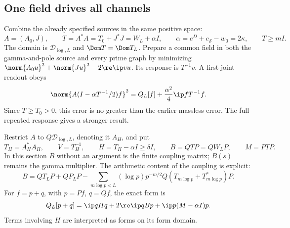 \subsection{One field drives all channels}
Combine the already specified sources in the same positive space:
\begin{equation}\label{joint:reference}
A=(A_0,J),\qquad
T=A^*A=T_0+J^*J=W_L+\alpha I,\qquad
\alpha=e^D+c_{\mathcal S}-w_0=2\kappa,\qquad T\ge mI.
\end{equation}
The domain is $\mathcal D_{\log,L}$ and $\Dom T=\Dom T_L$.
Prepare a common field in both the gamma-and-pole source and
every prime graph by minimizing
$\norm{A_0u}^2+\norm{Ju}^2-2\re\ip v u$.
Its response is $T^{-1}v$. A first joint readout obeys
\[
\norm{A(I-\alpha T^{-1}/2)f}^2
 =Q_L[f]+\frac{\alpha^2}{4}\ip f{T^{-1}f}.
\]
Since $T\ge T_0>0$, this error is no greater than the earlier
massless error. The full repeated response gives a stronger result.

Restrict $A$ to $Q\mathcal D_{\log,L}$, denoting it $A_H$, and put
\[
T_H=A_H^*A_H,\qquad V=T_H^{-1},\qquad
H=T_H-\alpha I\ge\delta I,\qquad
B=QTP=QW_LP,\qquad M=PTP.
\]
In this section $B$ without an argument is the finite coupling
matrix; $B(s)$ remains the gamma multiplier.
The arithmetic content of the coupling is explicit:
\[
B=QT_LP+QP_LP-
\sum_{m\log p<L}(\log p)p^{-m/2}
                         Q(T_{m\log p}+T_{m\log p}^*)P .
\]
For $f=p+q$, with $p=Pf$, $q=Qf$, the exact form is
\begin{equation}\label{joint:blocks}
Q_L[p+q]=\ip q{Hq}+2\re\ip q{Bp}
                          +\ip p{(M-\alpha I)p}.
\end{equation}
Terms involving $H$ are interpreted as forms on its form domain.

